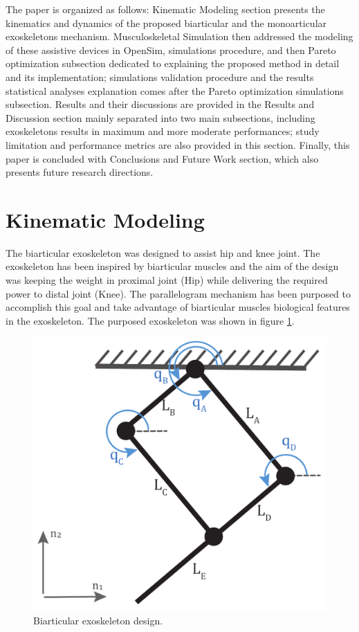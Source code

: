 \documentclass[10pt,letterpaper]{article}
\begin{document}
The paper is organized as follows: Kinematic Modeling section presents the kinematics and dynamics of the proposed biarticular and the monoarticular exoskeletons mechanism. Musculoskeletal Simulation then addressed the modeling of these assistive devices in OpenSim, simulations procedure, and then Pareto optimization subsection dedicated to explaining the proposed method in detail and its implementation; simulations validation procedure and the results statistical analyses explanation comes after the Pareto optimization simulations subsection. Results and their discussions are provided in the Results and Discussion section mainly separated into two main subsections, including exoskeletons results in maximum and more moderate performances; study limitation and performance metrics are also provided in this section. Finally, this paper is concluded with Conclusions and Future Work section, which also presents future research directions.
\section*{Kinematic Modeling}
The biarticular exoskeleton was designed to assist hip and knee joint. The exoskeleton has been inspired by biarticular muscles and the aim of the design was keeping the weight in proximal joint (Hip) while delivering the required power to distal joint (Knee). The parallelogram mechanism has been purposed to accomplish this goal and take advantage of biarticular muscles biological features in the exoskeleton.  The purposed exoskeleton was shown in figure \ref{Fig_Biarticular_Exo_Mechanism}.
\begin{figure}[h!]
	\centering
	\includegraphics[width=2 in]{Cartoons/Biarticular_Exo_Mechanism.pdf}
	\caption{Biarticular exoskeleton design.}
	\label{Fig_Biarticular_Exo_Mechanism}
\end{figure}
\end{document}
